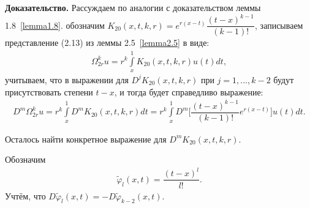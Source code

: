 \textbf{Доказательство.} Рассуждаем по аналогии с доказательством леммы 1.8~\eqref{lemma1.8}. обозначим $ K_{20}(x,t,k,r) = e^{r(x-t)}\dfrac{(t-x)^{k-1}}{(k-1)!} $, записываем представление (2.13) из леммы 2.5~\eqref{lemma2.5} в виде:
\begin{equation}
\begin{array}{c}
\nonumber

\Omega_{2r}^ku = r^k\int\limits_x^1 K_{20}(x,t,k,r)u(t)dt,

\end{array}
\end{equation}
учитываем, что в выражении для $ D^jK_{20}(x,t,k,r) $ при $ j=1,...,k-2 $ будут присутствовать степени $ t-x $, и тогда будет справедливо выражение:
\begin{equation}
\begin{array}{c}

D^m\Omega_{2r}^ku = r^k\int\limits_x^1 D^mK_{20}(x,t,k,r)dt = r^k\int\limits_x^1 D^m\biggl[\dfrac{(t-x)^{k-1}}{(k-1)!}e^{r(x-t)}\biggr]u(t)dt.

\end{array}
\end{equation}

Осталось найти конкретное выражение для $ D^mK_{20}(x,t,k,r) $.

Обозначим
\begin{equation}
\begin{array}{c}
\nonumber

\widetilde\varphi_l(x,t) = \dfrac{(t-x)^l}{l!}.

\end{array}
\end{equation}
Учтём, что $ D\widetilde\varphi_l(x,t) = -D\widetilde\varphi_{k-2}(x,t) $.

